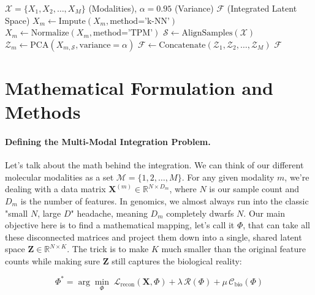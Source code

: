 \documentclass[runningheads]{llncs}
\begin{document}
\begin{algorithm}[H]
\caption{Tiered Multi-Omics Integration.}\label{alg:integration}
\begin{algorithmic}[1]
\REQUIRE $\mathcal{X} = \{X_1, X_2, \dots, X_M\}$ (Modalities), $\alpha = 0.95$ (Variance)
\ENSURE $\mathcal{F}$ (Integrated Latent Space)
    \STATE $X_m \gets \text{Impute}(X_m, \text{method='k-NN'})$
    \STATE $X_m \gets \text{Normalize}(X_m, \text{method='TPM'})$
\ENDFOR
\STATE $\mathcal{S} \gets \text{AlignSamples}(\mathcal{X})$
    \STATE $\mathcal{Z}_m \gets \text{PCA}(X_{m, \mathcal{S}}, \text{variance}=\alpha)$
\ENDFOR
\STATE $\mathcal{F} \gets \text{Concatenate}(\mathcal{Z}_1, \mathcal{Z}_2, \dots, \mathcal{Z}_M)$
\RETURN $\mathcal{F}$
\end{algorithmic}
\end{algorithm}

\section{Mathematical Formulation and Methods}

\paragraph{Defining the Multi-Modal Integration Problem.}
Let's talk about the math behind the integration. We can think of our different molecular modalities as a set $\mathcal{M} = \{1, 2, \ldots, M\}$. For any given modality $m$, we're dealing with a data matrix $\mathbf{X}^{(m)} \in \mathbb{R}^{N \times D_m}$, where $N$ is our sample count and $D_m$ is the number of features. In genomics, we almost always run into the classic "small $N$, large $D$" headache, meaning $D_m$ completely dwarfs $N$. Our main objective here is to find a mathematical mapping, let's call it $\Phi$, that can take all these disconnected matrices and project them down into a single, shared latent space $\mathbf{Z} \in \mathbb{R}^{N \times K}$. The trick is to make $K$ much smaller than the original feature counts while making sure $\mathbf{Z}$ still captures the biological reality:

\begin{equation}
\Phi^{*} = \arg\min_{\Phi} \; \mathcal{L}_{\text{recon}}(\mathbf{X}, \Phi) + \lambda \, \mathcal{R}(\Phi) + \mu \, \mathcal{C}_{\text{bio}}(\Phi)
\end{equation}
\end{document}
